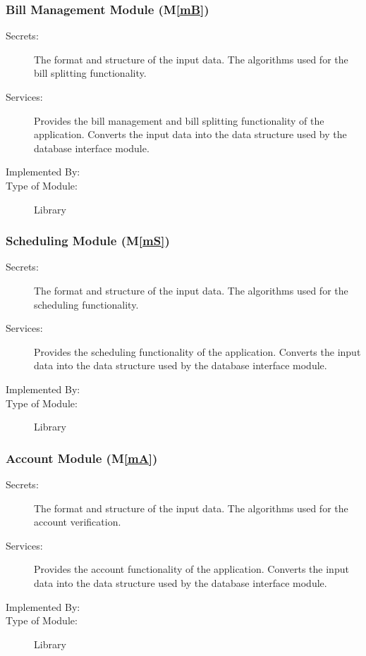 \documentclass[12pt, titlepage]{article}
\newcommand{\mref}[1]{M\ref{#1}}
\begin{document}
\subsubsection{Bill Management Module (\mref{mB})}

\begin{description}
\item[Secrets:]The format and structure of the input data. The algorithms used for the bill splitting functionality.
\item[Services:] Provides the bill management and bill splitting functionality of the application. Converts the input data into the data structure used by the database interface module. 
\item[Implemented By:] \progname{}
\item[Type of Module:] Library
\end{description}

\subsubsection{Scheduling Module (\mref{mS})}

\begin{description}
\item[Secrets:] The format and structure of the input data. The algorithms used for the scheduling functionality.
\item[Services:] Provides the scheduling functionality of the application. Converts the input data into the data structure used by the database interface module. 
\item[Implemented By:] \progname{}
\item[Type of Module:] Library
\end{description}

\subsubsection{Account Module (\mref{mA})}

\begin{description}
\item[Secrets:] The format and structure of the input data. The algorithms used for the account verification.
\item[Services:] Provides the account functionality of the application. Converts the input data into the data structure used by the database interface module. 
\item[Implemented By:] \progname{}
\item[Type of Module:] Library
\end{description}
\end{document}
